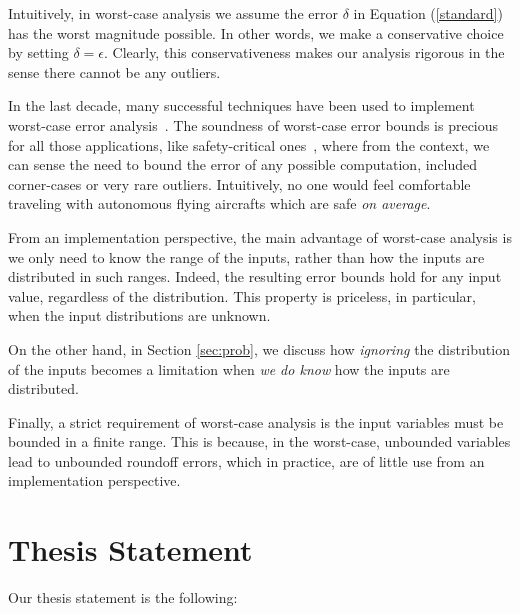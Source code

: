 Intuitively, in worst-case analysis we assume the error $\delta$ in Equation (\ref{standard}) has the worst magnitude possible. In other words, we make a conservative choice by setting $\delta=\epsilon$.
%
Clearly, this conservativeness makes our analysis rigorous in the sense there cannot be any outliers.
%

In the last decade, many successful techniques have been used to implement worst-case error analysis~\cite{darulova2018daisy,2015_fm_sjrg,solovyev2018rigorous,rosa,fptuner,smartfloat,satire,gappa,fluctuat}.
%
%
The soundness of worst-case error bounds is precious for all those applications, like safety-critical ones~\cite{guardstable, cpralg}, where from the context, we can sense the need to bound the error of any possible computation, included corner-cases or very rare outliers.
%
Intuitively, no one would feel comfortable traveling with autonomous flying aircrafts which are safe \emph{on average}.

%
From an implementation perspective, the main advantage of worst-case analysis is we only need to know the range of the inputs, rather than how the inputs are distributed in such ranges. 
%
Indeed, the resulting error bounds hold for any input value, regardless of the distribution.
%
%
This property is priceless, in particular, when the input distributions are unknown.
%

On the other hand, in Section \ref{sec:prob}, we discuss how \emph{ignoring} the distribution of the inputs becomes a limitation when \emph{we do know} how the inputs are distributed.
%

Finally, a strict requirement of worst-case analysis is the input variables must be bounded  in a finite range. This is because, in the worst-case, unbounded variables lead to unbounded roundoff errors, which in practice, are of little use from an implementation perspective.
%
\section{Thesis Statement}
%
Our thesis statement is the following: 

